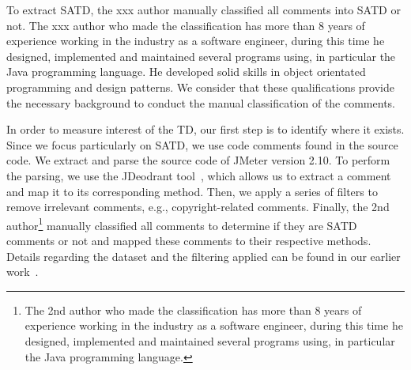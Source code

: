 To extract SATD, the xxx author manually classified all comments into SATD or not.
The xxx author who made the classification has more than 8 years of experience working in the industry as a software engineer, during this time he designed, implemented and maintained several programs using, in particular the Java programming language. He developed solid skills in object orientated programming and design patterns. We consider that these qualifications provide the necessary background to conduct the manual classification of the comments.
\fi


In order to measure interest of the TD, our first step is to identify where it exists. Since we focus particularly on SATD, we use code comments found in the source code. We extract and parse the source code of JMeter version 2.10. To perform the parsing, we use the JDeodrant tool~\cite{Tsantalis2008CSMR}, which allows us to extract a comment and map it to its corresponding method. Then, we apply a series of filters to remove irrelevant comments, e.g., copyright-related comments. Finally, the 2nd author\footnote{The 2nd author who made the classification has more than 8 years of experience working in the industry as a software engineer, during this time he designed, implemented and maintained several programs using, in particular the Java programming language.} manually classified all comments to determine if they are SATD comments or not and mapped these comments to their respective methods. Details regarding the dataset and the filtering applied can be found in our earlier work~\cite{Maldonado2015MTD}.




